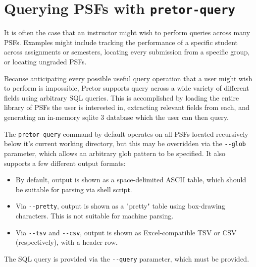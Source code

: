 \documentclass{book}
\begin{document}
\section{Querying PSFs with \texttt{pretor-query}}

It is often the case that an instructor might wish to perform queries across
many PSFs. Examples might include tracking the performance of a specific
student across assignments or semesters, locating every submission from a
specific group, or locating ungraded PSFs.

Because anticipating every possible useful query operation that a user might
wish to perform is impossible, Pretor supports query across a wide variety of
different fields using arbitrary SQL queries. This is accomplished by loading
the entire library of PSFs the user is interested in, extracting relevant
fields from each, and generating an in-memory sqlite 3 database which the user
can then query.

The \texttt{pretor-query} command by default operates on all PSFs located
recursively below it's current working directory, but this may be overridden
via the \texttt{-{}-glob} parameter, which allows an arbitrary glob pattern
to be specified. It also supports a few different output formats:

\begin{itemize}

	\item By default, output is shown as a space-delimited ASCII table,
		which should be suitable for parsing via shell script.

	\item Via \texttt{-{}-pretty}, output is shown as a "pretty" table
		using box-drawing characters. This is not suitable for
		machine parsing.

	\item Via \texttt{-{}-tsv} and \texttt{-{}-csv}, output is shown as
		Excel-compatible TSV or CSV (respectively), with a header row.

\end{itemize}

The SQL query is provided via the \texttt{-{}-query} parameter, which must
be provided.

\end{document}
